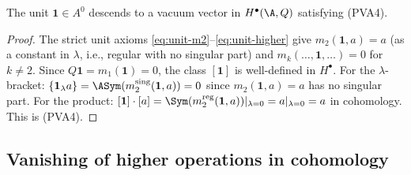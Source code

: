 \begin{proposition}
The unit $\mathbf{1}\in A^0$ descends to a vacuum vector in $H^\bullet(\A,Q)$ satisfying (PVA4).
\end{proposition}
\begin{proof}
The strict unit axioms \eqref{eq:unit-m2}--\eqref{eq:unit-higher} give $m_2(\mathbf{1},a)=a$ (as a constant in $\lambda$, i.e., regular with no singular part) and $m_k(\ldots,\mathbf{1},\ldots)=0$ for $k\neq 2$. Since $Q\mathbf{1}=m_1(\mathbf{1})=0$, the class $[\mathbf{1}]$ is well-defined in $H^\bullet$. For the $\lambda$-bracket: $\{\mathbf{1}_\lambda a\} = \ASym(m_2^{\mathrm{sing}}(\mathbf{1},a)) = 0$ since $m_2(\mathbf{1},a) = a$ has no singular part. For the product: $[\mathbf{1}]\cdot [a] = \Sym(m_2^{\mathrm{reg}}(\mathbf{1},a))|_{\lambda=0} = a|_{\lambda=0} = a$ in cohomology. This is (PVA4).
\end{proof}

\subsection{Vanishing of higher operations in cohomology}

